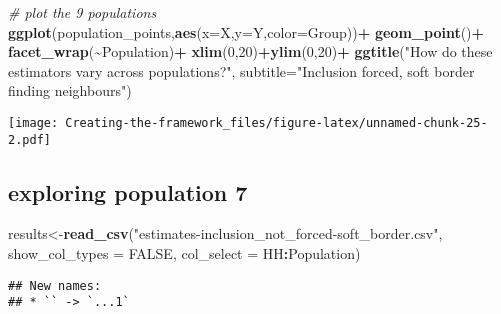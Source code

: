 \documentclass[
]{article}
\newenvironment{Shaded}{\begin{snugshade}}{\end{snugshade}}
\newcommand{\AttributeTok}[1]{\textcolor[rgb]{0.13,0.29,0.53}{#1}}
\newcommand{\CommentTok}[1]{\textcolor[rgb]{0.56,0.35,0.01}{\textit{#1}}}
\newcommand{\ConstantTok}[1]{\textcolor[rgb]{0.56,0.35,0.01}{#1}}
\newcommand{\DecValTok}[1]{\textcolor[rgb]{0.00,0.00,0.81}{#1}}
\newcommand{\FunctionTok}[1]{\textcolor[rgb]{0.13,0.29,0.53}{\textbf{#1}}}
\newcommand{\NormalTok}[1]{#1}
\newcommand{\OtherTok}[1]{\textcolor[rgb]{0.56,0.35,0.01}{#1}}
\newcommand{\SpecialCharTok}[1]{\textcolor[rgb]{0.81,0.36,0.00}{\textbf{#1}}}
\newcommand{\StringTok}[1]{\textcolor[rgb]{0.31,0.60,0.02}{#1}}
\begin{document}
\begin{Shaded}
\begin{Highlighting}[]
\CommentTok{\# plot the 9 populations}
\FunctionTok{ggplot}\NormalTok{(population\_points,}\FunctionTok{aes}\NormalTok{(}\AttributeTok{x=}\NormalTok{X,}\AttributeTok{y=}\NormalTok{Y,}\AttributeTok{color=}\NormalTok{Group))}\SpecialCharTok{+}
  \FunctionTok{geom\_point}\NormalTok{()}\SpecialCharTok{+}
  \FunctionTok{facet\_wrap}\NormalTok{(}\SpecialCharTok{\textasciitilde{}}\NormalTok{Population)}\SpecialCharTok{+}
  \FunctionTok{xlim}\NormalTok{(}\DecValTok{0}\NormalTok{,}\DecValTok{20}\NormalTok{)}\SpecialCharTok{+}\FunctionTok{ylim}\NormalTok{(}\DecValTok{0}\NormalTok{,}\DecValTok{20}\NormalTok{)}\SpecialCharTok{+}
  \FunctionTok{ggtitle}\NormalTok{(}\StringTok{"How do these estimators vary across populations?"}\NormalTok{,}
          \AttributeTok{subtitle=}\StringTok{"Inclusion forced, soft border finding neighbours"}\NormalTok{)}
\end{Highlighting}
\end{Shaded}

\texttt{[image: Creating-the-framework\_files/figure-latex/unnamed-chunk-25-2.pdf]}

\subsection{exploring population 7}\label{exploring-population-7}

\begin{Shaded}
\begin{Highlighting}[]
\NormalTok{results}\OtherTok{\textless{}{-}}\FunctionTok{read\_csv}\NormalTok{(}\StringTok{"estimates{-}inclusion\_not\_forced{-}soft\_border.csv"}\NormalTok{,}
                      \AttributeTok{show\_col\_types =} \ConstantTok{FALSE}\NormalTok{,}
                      \AttributeTok{col\_select =}\NormalTok{ HH}\SpecialCharTok{:}\NormalTok{Population)}
\end{Highlighting}
\end{Shaded}

\begin{verbatim}
## New names:
## * `` -> `...1`
\end{verbatim}

\begin{Shaded}
\end{Shaded}
\end{document}
